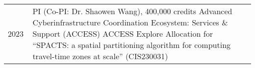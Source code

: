 \documentclass{acmcv}
\begin{document}
		\vspace{-.5cm}
		\nocite{*}
		\printbibliography[title={\normalsize \uppercase{Journal Articles}},type=article]
		\vspace{-.8cm}
		\printbibliography[title={\normalsize \uppercase{Peer-Reviewed Conference Papers}},type=inproceedings, keyword=confpaper]
		\vspace{-.8cm}
        \printbibliography[title={\normalsize \uppercase{Conference Abstracts}}, keyword=extabs]
	

\begin{longtable}{p{0.1\linewidth} p{0.9\linewidth}}
    2023 & PI (Co-PI: Dr. Shaowen Wang), 400,000 credits \newline Advanced Cyberinfrastructure Coordination Ecosystem: Services \& Support (ACCESS) \newline ACCESS Explore Allocation for “SPACTS: a spatial partitioning algorithm for computing travel-time zones at scale” (CIS230031) \\

\end{longtable}


\end{document}
